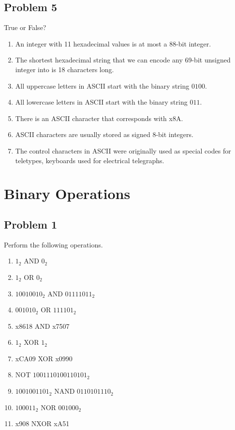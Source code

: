 \documentclass{article}
\begin{document}
\subsection*{Problem 5}
True or False?
\begin{enumerate}[label=\alph*.]
    \item An integer with 11 hexadecimal values is at most a 88-bit integer.
    \item The shortest hexadecimal string that we can encode any 69-bit unsigned integer into is 18 characters long.
    \item All uppercase letters in ASCII start with the binary string $0100$.
    \item All lowercase letters in ASCII start with the binary string $011$.
    \item There is an ASCII character that corresponds with x8A.
    \item ASCII characters are usually stored as signed 8-bit integers.
    \item The control characters in ASCII were originally used as special codes for teletypes, keyboards used for electrical telegraphs. 
\end{enumerate}

\newpage
\section*{Binary Operations} %

\subsection*{Problem 1}
Perform the following operations. 
\begin{enumerate}[label=\alph*.]
    \item $1_2$ AND $0_2$
    \item $1_2$ OR $0_2$
    \item $10010010_2$ AND $01111011_2$
    \item $001010_2$ OR $111101_2$
    \item x8618 AND x7507
    \item $1_2$ XOR $1_2$
    \item xCA09 XOR x0990
    \item NOT $1001110100110101_2$
    \item $1001001101_2$ NAND $0110101110_2$
    \item $100011_2$ NOR $001000_2$
    \item x908 NXOR xA51
\end{enumerate}
\end{document}
